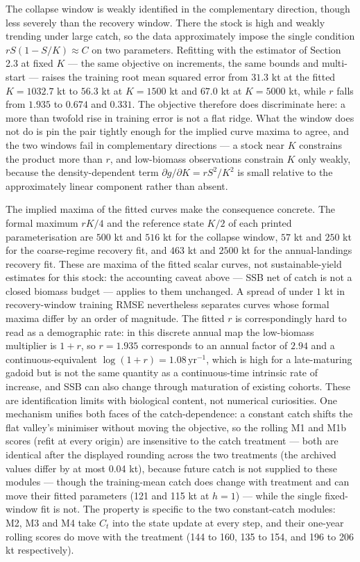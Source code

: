 \documentclass[11pt]{article}
\begin{document}
The collapse window is weakly identified in the complementary direction,
though less severely than the recovery window. There the stock is high
and weakly trending under large catch, so the data approximately impose
the single condition \(rS(1-S/K)\approx C\) on two parameters. Refitting
with the estimator of Section 2.3 at fixed \(K\) --- the same objective
on increments, the same bounds and multi-start --- raises the training
root mean squared error from \(31.3\) kt at the fitted
\(K = 1032.7\) kt to \(56.3\) kt at \(K = 1500\) kt and \(67.0\) kt at
\(K = 5000\) kt, while \(r\) falls from \(1.935\) to \(0.674\) and
\(0.331\). The objective therefore does discriminate here: a more than
twofold rise in training error is not a flat ridge. What the window does
not do is pin the pair tightly enough for the implied curve maxima to
agree, and the two windows fail in complementary directions --- a stock
near \(K\) constrains the product more than \(r\), and low-biomass
observations constrain \(K\) only weakly, because the density-dependent
term \(\partial g/\partial K = rS^{2}/K^{2}\) is small relative to the
approximately linear component rather than absent.

The implied maxima of the fitted curves make the consequence concrete.
The formal maximum \(rK/4\) and the reference state \(K/2\) of each
printed parameterisation are \(500\) kt and \(516\) kt for the collapse
window, \(57\) kt and \(250\) kt for the coarse-regime recovery fit, and
\(463\) kt and \(2500\) kt for the annual-landings recovery fit. These
are maxima of the fitted scalar curves, not sustainable-yield estimates
for this stock: the accounting caveat above --- SSB net of catch is not
a closed biomass budget --- applies to them unchanged. A spread of under
\(1\) kt in recovery-window training RMSE nevertheless separates curves
whose formal maxima differ by an order of magnitude. The fitted \(r\) is
correspondingly hard to read as a demographic rate: in this discrete
annual map the low-biomass multiplier is \(1+r\), so \(r = 1.935\)
corresponds to an annual factor of \(2.94\) and a continuous-equivalent
\(\log(1+r) = 1.08\,\mathrm{yr}^{-1}\), which is high for a
late-maturing gadoid but is not the same quantity as a continuous-time
intrinsic rate of increase, and SSB can also change through maturation
of existing cohorts. These are identification limits with biological
content, not numerical curiosities. One mechanism
unifies both faces of the catch-dependence: a constant catch shifts the
flat valley's minimiser without moving the objective, so the rolling
M1 and M1b scores (refit at every origin) are insensitive to the catch
treatment --- both are identical after the displayed rounding across the two
treatments (the archived values differ by at most 0.04 kt), because
future catch is not supplied to these modules --- though the
training-mean catch does change with treatment and can move their fitted
parameters (121 and 115 kt at \(h=1\)) --- while the single
fixed-window fit is not. The property is specific to the two
constant-catch modules: M2, M3 and M4 take \(C_t\) into the state
update at every step, and their one-year rolling scores do move with the
treatment (144 to 160, 135 to 154, and 196 to 206 kt respectively).
\end{document}
